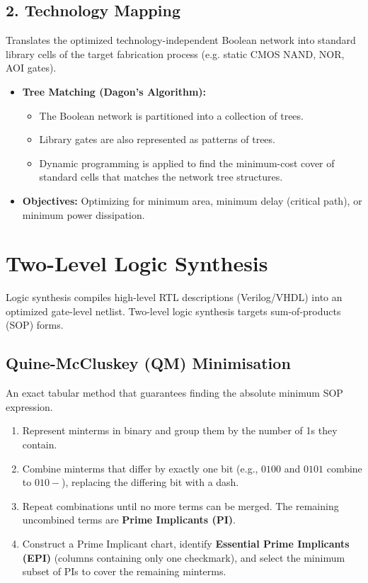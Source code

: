 \documentclass[12pt,a4paper]{article}
\begin{document}
\subsection{2. Technology Mapping}
Translates the optimized technology-independent Boolean network into standard library cells of the target fabrication process (e.g. static CMOS NAND, NOR, AOI gates).
\begin{itemize}[leftmargin=*, itemsep=3pt]
  \item \textbf{Tree Matching (Dagon's Algorithm):}
        \begin{itemize}[leftmargin=*, label=$\bullet$, itemsep=1.5pt]
          \item The Boolean network is partitioned into a collection of trees.
          \item Library gates are also represented as patterns of trees.
          \item Dynamic programming is applied to find the minimum-cost cover of standard cells that matches the network tree structures.
        \end{itemize}
  \item \textbf{Objectives:} Optimizing for minimum area, minimum delay (critical path), or minimum power dissipation.
\end{itemize}

\section{Two-Level Logic Synthesis}

Logic synthesis compiles high-level RTL descriptions (Verilog/VHDL) into an optimized gate-level netlist. Two-level logic synthesis targets sum-of-products (SOP) forms.

\subsection{Quine-McCluskey (QM) Minimisation}
An exact tabular method that guarantees finding the absolute minimum SOP expression.
\begin{enumerate}[leftmargin=*, itemsep=2.5pt]
  \item Represent minterms in binary and group them by the number of 1s they contain.
  \item Combine minterms that differ by exactly one bit (e.g., $0100$ and $0101$ combine to $010-$), replacing the differing bit with a dash.
  \item Repeat combinations until no more terms can be merged. The remaining uncombined terms are \textbf{Prime Implicants (PI)}.
  \item Construct a Prime Implicant chart, identify \textbf{Essential Prime Implicants (EPI)} (columns containing only one checkmark), and select the minimum subset of PIs to cover the remaining minterms.
\end{enumerate}
\end{document}
